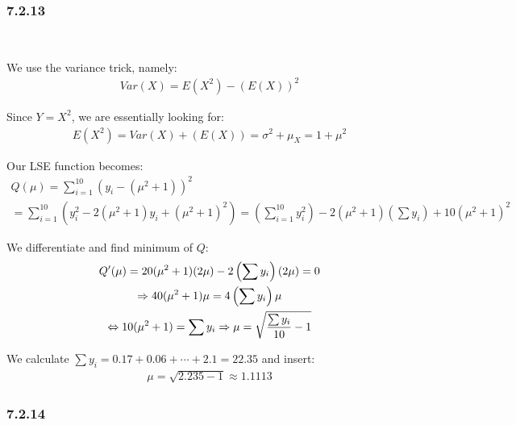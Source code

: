 \subsubsection{7.2.13}\hfill\\\par
\noindent We use the variance trick, namely:
\begin{equation*}
  \begin{gathered}
    Var(X) = E(X^2)-(E(X))^2
  \end{gathered}
\end{equation*}\par
\noindent Since $Y = X^2$, we are essentially looking for:
\begin{equation*}
  \begin{gathered}
    E(X^2) = Var(X) + (E(X)) = \sigma^2 + \mu_X = 1+\mu^2
  \end{gathered}
\end{equation*}\par
\noindent Our LSE function becomes: 
\begin{equation*}
  \begin{gathered}
    Q(\mu) = \sum_{i=1}^{10}(y_i-(\mu^2+1))^2\\
    = \sum_{i=1}^{10}\left(y_i^2-2(\mu^2+1)y_i+(\mu^2+1)^2\right) = \left(\sum_{i=1}^{10}y_i^2\right)-2(\mu^2+1)\left(\sum y_i\right) + 10(\mu^2+1)^2
  \end{gathered}
\end{equation*}\par
\noindent We differentiate and find minimum of $Q$:
\begin{equation*}
  \begin{gathered}
    Q^{\prime}(\mu) = 20(\mu^2+1)(2\mu)-2\left(\sum y_i\right)(2\mu) = 0\\
    \Rightarrow 40(\mu^2+1)\mu = 4\left(\sum y_i\right)\mu\\
    \Leftrightarrow 10(\mu^2+1) =\sum y_i \Rightarrow \mu = \sqrt{\dfrac{\sum y_i}{10}-1}
  \end{gathered}
\end{equation*}\par
\noindent We calculate $\sum y_i = 0.17+0.06+\cdots+2.1 = 22.35$ and insert:
\begin{equation*}
  \begin{gathered}
    \mu = \sqrt{2.235-1}\approx 1.1113
  \end{gathered}
\end{equation*}
\par\bigskip
\subsubsection{7.2.14}\hfill\\\par
\par\bigskip
